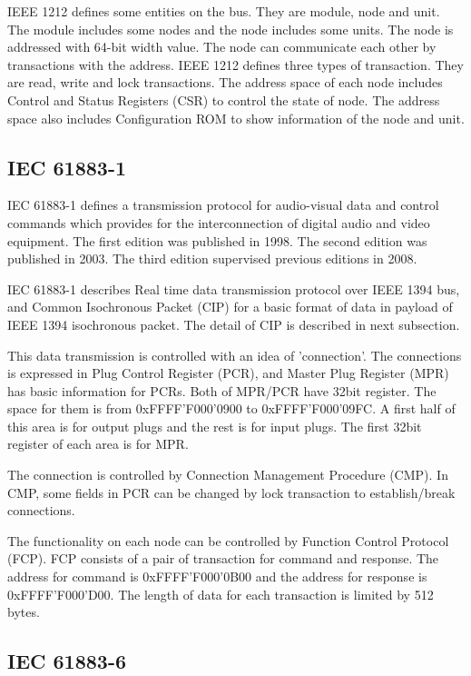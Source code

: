 \documentclass[onecolumn]{article}
\begin{document}
IEEE 1212 defines some entities on the bus. They are module, node and unit. The module includes some nodes and the node includes some units. The node is addressed with 64-bit width value. The node can communicate each other by transactions with the address. IEEE 1212 defines three types of transaction. They are read, write and lock transactions. The address space of each node includes Control and Status Registers (CSR) to control the state of node. The address space also includes Configuration ROM to show information of the node and unit.


\subsection{IEC 61883-1}

IEC 61883-1 defines a transmission protocol for audio-visual data and control commands which provides for the interconnection of digital audio and video equipment. The first edition was published in 1998\cite{iec61883-1-1}. The second edition was published in 2003\cite{iec61883-1-2}. The third edition supervised previous editions in 2008\cite{iec61883-1-3}.

IEC 61883-1 describes Real time data transmission protocol over IEEE 1394 bus, and Common Isochronous Packet (CIP) for a basic format of data in payload of IEEE 1394 isochronous packet. The detail of CIP is described in next subsection.

This data transmission is controlled with an idea of 'connection'. The connections is expressed in Plug Control Register (PCR), and Master Plug Register (MPR) has basic information for PCRs. Both of MPR/PCR have 32bit register. The space for them is from 0xFFFF'F000'0900 to 0xFFFF'F000'09FC. A first half of this area is for output plugs and the rest is for input plugs. The first 32bit register of each area is for MPR.

The connection is controlled by Connection Management Procedure (CMP). In CMP, some fields in PCR can be changed by lock transaction to establish/break connections.

The functionality on each node can be controlled by Function Control Protocol (FCP). FCP consists of a pair of transaction for command and response. The address for command is 0xFFFF'F000'0B00 and the address for response is 0xFFFF'F000'D00. The length of data for each transaction is limited by 512 bytes.


\subsection{IEC 61883-6}
\end{document}
